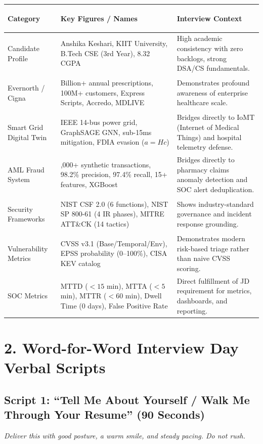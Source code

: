 \documentclass[10pt,a4paper]{article}
\begin{document}
\begin{table}[h!]
\centering
\small
\begin{tabularx}{\textwidth}{>{\bfseries\raggedright\arraybackslash}p{3.2cm} >{\raggedright\arraybackslash}X >{\raggedright\arraybackslash}X}
\toprule
\textbf{Category} & \textbf{Key Figures / Names} & \textbf{Interview Context} \\
\midrule
Candidate Profile & Anshika Keshari, KIIT University, B.Tech CSE (3rd Year), 8.32 CGPA & High academic consistency with zero backlogs, strong DSA/CS fundamentals. \\
\addlinespace
Evernorth / Cigna & 1 Billion+ annual prescriptions, 100M+ customers, Express Scripts, Accredo, MDLIVE & Demonstrates profound awareness of enterprise healthcare scale. \\
\addlinespace
Smart Grid Digital Twin & IEEE 14-bus power grid, GraphSAGE GNN, sub-15ms mitigation, FDIA evasion ($a=Hc$) & Bridges directly to IoMT (Internet of Medical Things) and hospital telemetry defense. \\
\addlinespace
AML Fraud System & 10,000+ synthetic transactions, 98.2\% precision, 97.4\% recall, 15+ features, XGBoost & Bridges directly to pharmacy claims anomaly detection and SOC alert deduplication. \\
\addlinespace
Security Frameworks & NIST CSF 2.0 (6 functions), NIST SP 800-61 (4 IR phases), MITRE ATT\&CK (14 tactics) & Shows industry-standard governance and incident response grounding. \\
\addlinespace
Vulnerability Metrics & CVSS v3.1 (Base/Temporal/Env), EPSS probability (0--100\%), CISA KEV catalog & Demonstrates modern risk-based triage rather than naive CVSS scoring. \\
\addlinespace
SOC Metrics & MTTD ($<15$ min), MTTA ($<5$ min), MTTR ($<60$ min), Dwell Time (0 days), False Positive Rate & Direct fulfillment of JD requirement for metrics, dashboards, and reporting. \\
\bottomrule
\end{tabularx}
\end{table}

\section{2. Word-for-Word Interview Day Verbal Scripts}

\subsection{Script 1: ``Tell Me About Yourself / Walk Me Through Your Resume'' (90 Seconds)}
\textit{Deliver this with good posture, a warm smile, and steady pacing. Do not rush.}
\end{document}
